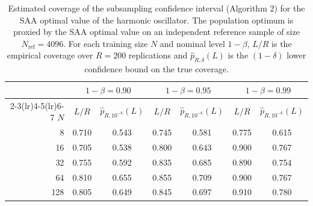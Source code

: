 \begin{table}[t]
  \centering
  \caption{Estimated coverage of the subsampling confidence interval (Algorithm 2) for the SAA optimal value of the harmonic oscillator. The population optimum is proxied by the SAA optimal value on an independent reference sample of size $N_{\mathrm{ref}} = 4096$. For each training size $N$ and nominal level $1-\beta$, $L/R$ is the empirical coverage over $R=200$ replications and $\widehat p_{R,\delta}(L)$ is the $(1-\delta)$ lower confidence bound on the true coverage.}
  \label{tab:coverage_subsampling}
  \begin{tabular}{rcccccc}
    \toprule
     & \multicolumn{2}{c}{$1-\beta = 0.90$} & \multicolumn{2}{c}{$1-\beta = 0.95$} & \multicolumn{2}{c}{$1-\beta = 0.99$} \\
    \cmidrule(lr){2-3}\cmidrule(lr){4-5}\cmidrule(lr){6-7}
    $N$ & $L/R$ & $\widehat{p}_{R,10^{-6}}(L)$ & $L/R$ & $\widehat{p}_{R,10^{-6}}(L)$ & $L/R$ & $\widehat{p}_{R,10^{-6}}(L)$ \\
    \midrule
    8 & 0.710 & 0.543 & 0.745 & 0.581 & 0.775 & 0.615 \\
    16 & 0.705 & 0.538 & 0.800 & 0.643 & 0.900 & 0.767 \\
    32 & 0.755 & 0.592 & 0.835 & 0.685 & 0.890 & 0.754 \\
    64 & 0.810 & 0.655 & 0.855 & 0.709 & 0.900 & 0.767 \\
    128 & 0.805 & 0.649 & 0.845 & 0.697 & 0.910 & 0.780 \\
    \bottomrule
  \end{tabular}
\end{table}
